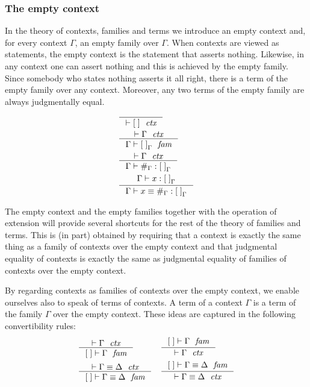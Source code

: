 \subsubsection{The empty context}
\label{empty}
In the theory of contexts, families and terms we introduce an empty context and,
for every context $\Gamma$, an empty family over $\Gamma$. 
When contexts are viewed as statements, the empty context is the statement that
asserts nothing. Likewise, in any context one can assert nothing and this is
achieved by the empty family. 
Since somebody who states nothing asserts it all right, there is a term of the empty
family over any context. Moreover, any two terms of the empty family are always
judgmentally equal.
\begin{align}
& \inference
  { }
  { \jctx{\emptyc}
    }
  \\
& \inference
  { \jctx{\Gamma}
    }
  { \jfam{\Gamma}{\emptyf[\Gamma]}
    }
  \\
& \inference
  { \jctx{\Gamma}
    }
  { \jterm{\Gamma}{\emptyf[\Gamma]}{\emptytm[\Gamma]}
    }
  \\
& \inference
  { \jterm{\Gamma}{\emptyf[\Gamma]}{x}
    }
  { \jtermeq
      {\Gamma}
      {\emptyf[\Gamma]}
      {x}
      {\emptytm[\Gamma]}
    }
  \label{comp-00-t}
\end{align}

The empty context and the empty families together with the operation of
extension will provide several shortcuts for the rest
of the theory of families and terms. This is (in part) obtained by requiring
that a context is exactly the same thing as a family of contexts over the
empty context and that judgmental equality of contexts is exactly the same
as judgmental equality of families of contexts over the empty context. 

By regarding contexts as families of contexts over the empty context, we
enable ourselves also to speak of terms of contexts. A term of a context
$\Gamma$ is a term of the family $\Gamma$ over the empty context. These ideas
are captured in the following convertibility rules:
\begin{align}
& \inference
  { \jctx{\Gamma}
    }
  { \jfam{\emptyc}{\Gamma}
    } 
& & \inference
    { \jfam{\emptyc}{\Gamma}
      }
    { \jctx{\Gamma}
      }
    \\
& \inference
  { \jctxeq{\Gamma}{\Delta}
    }
  { \jfameq{\emptyc}{\Gamma}{\Delta}
    }
& & \inference
    { \jfameq{\emptyc}{\Gamma}{\Delta}
      }
    { \jctxeq{\Gamma}{\Delta}
      }
\end{align}

